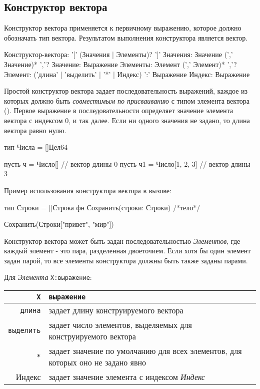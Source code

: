 \hypertarget{vector-composite}{%
\subsection{Конструктор вектора}\label{expr:vector-composite}}

Конструктор вектора применяется к первичному выражению, которое должно обозначать тип вектора. Результатом выполнения конструктора является вектор.

\begin{Grammar}
Конструктор-вектора: '[' (Значения | Элементы)? ']' 
Значения: Значение (',' Значение)* ','?
Значение: Выражение
Элементы:  Элемент (',' Элемент)* ','?
Элемент: 
    ('длина' | 'выделить' | '*' | Индекс) ':' Выражение
Индекс: Выражение
\end{Grammar}   

Простой конструктор вектора задает последовательность выражений, каждое из которых должно быть \emph{совместимым по присваиванию} с типом элемента вектора (). Первое выражение в последовательности определяет значение элемента вектора с индексом 0, и так далее. Если ни одного значения не задано, то длина вектора равно нулю.

\begin{Trivil}[vspace=2pt]
тип Числа = []Цел64

пусть ч = Число[] // вектор длины 0
пусть ч1 = Число[1, 2, 3] // вектор длины 3
\end{Trivil}

Пример использования конструктора вектора в вызове:
\begin{Trivil}[vspace=2pt]
тип Строки = []Строка
фн Сохранить(строки: Строки) { /*тело*/ }

Сохранить(Строки["привет", "мир"])
\end{Trivil}

Конструктор вектора может быть задан последовательностью \emph{Элементов}, где каждый элемент - это пара, разделенная двоеточием.
Если хотя бы один элемент задан парой, то все элементы конструктора должны быть также заданы парами.

\bigskip

Для \emph{Элемента} \verb+Х:выражение+:

\smallskip
\begin{tabular}[c]{r|p{8.5cm}}
\verb+X+ & \verb+выражение+ \\ 
\hline
\verb+длина+ &  задает длину конструируемого вектора \\
\hline
\verb+выделить+ & задает число элементов, выделяемых для конструируемого вектора \\
\hline
\verb+*+ & задает значение по умолчанию для всех элементов, для которых оно не задано явно \\
\hline
Индекс &  задает значение элемента с индексом \emph{Индекс} \\
\end{tabular}


